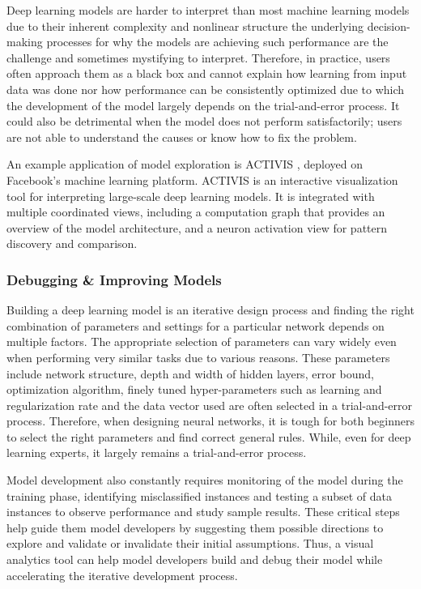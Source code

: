 Deep learning models are harder to interpret than most machine learning models due to their inherent complexity and nonlinear structure \cite{Samek} the underlying decision-making processes for why the models are achieving such performance are the challenge and sometimes mystifying to interpret. Therefore, in practice, users often approach them as a black box and cannot explain how learning from input data was done nor how performance can be consistently optimized due to which the development of the model largely depends on the trial-and-error process. It could also be detrimental when the model does not perform satisfactorily; users are not able to understand the causes or know how to fix the problem.

An example application of model exploration is ACTIVIS \cite{8022871}, deployed on Facebook's machine learning platform. ACTIVIS is an interactive visualization tool for interpreting large-scale deep learning models. It is integrated with multiple coordinated views, including a computation graph that provides an overview of the model architecture, and a neuron activation view for pattern discovery and comparison.

\subsubsection*{Debugging \& Improving Models}

Building a deep learning model is an iterative design process and finding the right combination of parameters and settings for a particular network depends on multiple factors. The appropriate selection of parameters can vary widely even when performing very similar tasks due to various reasons. These parameters include network structure, depth and width of hidden layers, error bound, optimization algorithm, finely tuned hyper-parameters such as learning and regularization rate and the data vector used are often selected in a trial-and-error process. Therefore, when designing neural networks, it is tough for both beginners to select the right parameters and find correct general rules. While, even for deep learning experts, it largely remains a trial-and-error process.

Model development also constantly requires monitoring of the model during the training phase, identifying misclassified instances and testing a subset of data instances to observe performance and study sample results. These critical steps help guide them model developers by suggesting them possible directions to explore and validate or invalidate their initial assumptions. Thus, a visual analytics tool can help model developers build and debug their model while accelerating the iterative development process.

